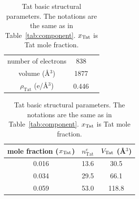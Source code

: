 \begin{table}[htbp]
  \centering
  \begin{tabular}{c c c}
    \hline
    number of electrons & 838 \\ 
    volume (\AA$^3$) & 1877 \\
    $\rho_\textrm{Tat}$ (e/\AA$^3$) & 0.446 \\
    \hline
  \end{tabular}
  \quad
  \begin{tabular}{ ccc }
    \hline
    mole fraction ($x_\textrm{Tat}$) & $n^e_\textrm{Tat}$ & $V_\textrm{Tat}$ (\AA$^3$) \\    
    \hline
    0.016 & 13.6 & 30.5 \\
    0.034 & 29.5 & 66.1 \\
    0.059 & 53.0 & 118.8 \\
    \hline
  \end{tabular}
  \caption[Tat basic structural parameters]
  {Tat basic structural parameters. The notations are the same
  as in Table~\ref{tab:component}. $x_\textrm{Tat}$ is Tat mole fraction.}
  \label{tab:Tat_basic_params}
\end{table}


